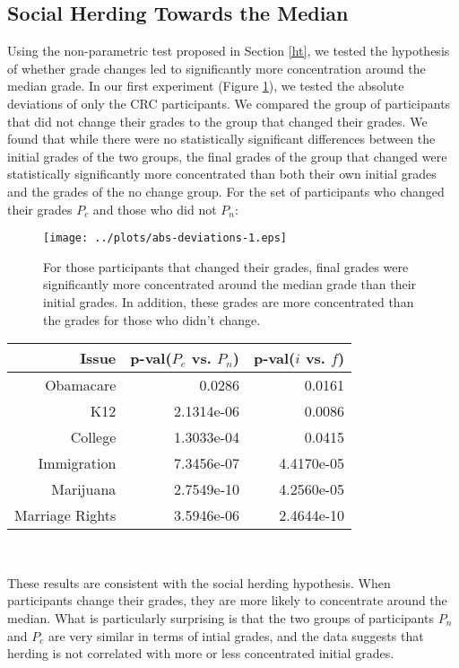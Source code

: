\subsection{Social Herding Towards the Median}
Using the non-parametric test proposed in Section \ref{ht}, we tested the hypothesis of whether grade changes led to significantly more concentration around the median grade.
In our first experiment (Figure \ref{mdev-1}), we tested the absolute deviations of only the CRC participants.
We compared the group of participants that did not change their grades to the group that changed their grades.
We found that while there were no statistically significant differences between the initial grades of the two groups, the final grades of the group that changed were statistically significantly more concentrated than both their own initial grades and the grades of the no change group.
For the set of participants who changed their grades $P_c$ and those who did not $P_n$:
\begin{figure}[h]
\hspace{-2em}
    \texttt{[image: ../plots/abs-deviations-1.eps]}
      \caption{For those participants that changed their grades, final grades were significantly more concentrated around the median grade than their initial grades. In addition, these grades are more concentrated than the grades for those who didn't change.}
      \label{mdev-1}
\end{figure}

{\centering
\scriptsize
\begin{tabular}[!ht] { r | r | r }
\label{dev-2}
  Issue & p-val($P_c$ vs. $P_n$) & p-val($i$ vs. $f$) \\
  \hline
  \hline
  Obamacare &  0.0286 & 0.0161 \\
  \hline
  K12 & 2.1314e-06 &  0.0086 \\
  \hline
  College & 1.3033e-04 & 0.0415 \\
  \hline
  Immigration & 7.3456e-07 &4.4170e-05\\
  \hline
  Marijuana & 2.7549e-10 & 4.2560e-05\\
  \hline
  Marriage Rights & 3.5946e-06 & 2.4644e-10 \\
\end{tabular}\\[1\baselineskip]
}

These results are consistent with the social herding hypothesis.
When participants change their grades, they are more likely to concentrate around the median.
What is particularly surprising is that the two groups of participants $P_n$ and $P_c$ are very similar in terms of intial grades, and the data suggests that herding is not correlated with more or less concentrated initial grades.

